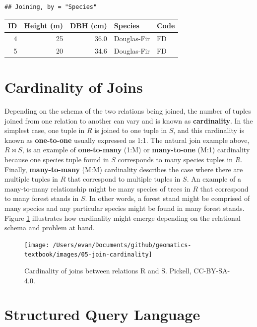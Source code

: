 \documentclass[
]{book}
\begin{document}
\begin{verbatim}
## Joining, by = "Species"
\end{verbatim}

\begin{tabular}{rrrll}
\toprule
ID & Height (m) & DBH (cm) & Species & Code\\
\midrule
4 & 25 & 36.0 & Douglas-Fir & FD\\
5 & 20 & 34.6 & Douglas-Fir & FD\\
\bottomrule
\end{tabular}

\hypertarget{cardinality-of-joins}{%
\section{Cardinality of Joins}\label{cardinality-of-joins}}

Depending on the schema of the two relations being joined, the number of tuples joined from one relation to another can vary and is known as \textbf{cardinality}. In the simplest case, one tuple in \(R\) is joined to one tuple in \(S\), and this cardinality is known as \textbf{one-to-one} usually expressed as 1:1. The natural join example above, \(R⋈S\), is an example of \textbf{one-to-many} (1:M) or \textbf{many-to-one} (M:1) cardinality because one species tuple found in \(S\) corresponds to many species tuples in \(R\). Finally, \textbf{many-to-many} (M:M) cardinality describes the case where there are multiple tuples in \(R\) that correspond to multiple tuples in \(S\). An example of a many-to-many relationship might be many species of trees in \(R\) that correspond to many forest stands in \(S\). In other words, a forest stand might be comprised of many species and any particular species might be found in many forest stands. Figure \ref{fig:5-join-cardinality} illustrates how cardinality might emerge depending on the relational schema and problem at hand.

\begin{figure}
\texttt{[image: /Users/evan/Documents/github/geomatics-textbook/images/05-join-cardinality]} \caption{Cardinality of joins between relations R and S. Pickell, CC-BY-SA-4.0.}\label{fig:5-join-cardinality}
\end{figure}

\hypertarget{structured-query-language}{%
\section{Structured Query Language}\label{structured-query-language}}
\end{document}
